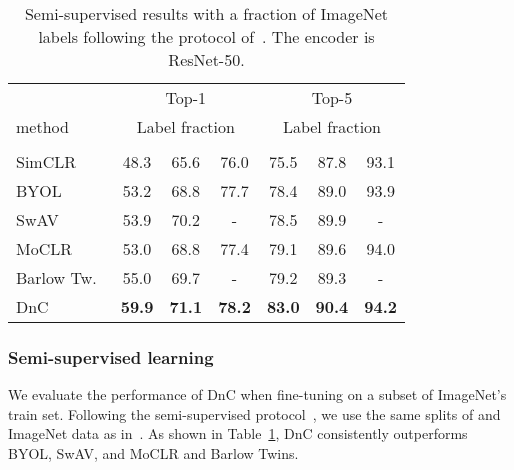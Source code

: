 \documentclass[final]{cvpr}
\newcommand\baseline{MoCLR}
\begin{document}
\begin{table}[t]
\caption{Semi-supervised results with a fraction of ImageNet labels following the protocol of~\cite{chen2020simple,grill2020bootstrap}. The encoder is ResNet-50.}
\vspace{-5pt}
\label{tab:semi_results}
\setlength{\tabcolsep}{4.5pt}
\begin{center}
\begin{small}
\begin{tabular}{lcccccc}
\toprule
 & \multicolumn{3}{c}{Top-1} & \multicolumn{3}{c}{Top-5}\\
method & \multicolumn{3}{c}{Label fraction} & \multicolumn{3}{c}{Label fraction}\\
 &  &  &  &  &  &  \\
\midrule
SimCLR~\cite{chen2020simple}     & 48.3 & 65.6 & 76.0    & 75.5 & 87.8 & 93.1 \\
BYOL~\cite{grill2020bootstrap}       & 53.2 & 68.8 & 77.7    & 78.4 & 89.0 & 93.9 \\
SwAV~\cite{caron2020unsupervised}    & 53.9 & 70.2 & -    & 78.5 & 89.9 & - \\
\baseline{}& 53.0 & 68.8 & 77.4    & 79.1 & 89.6 & 94.0 \\
Barlow Tw.~\cite{zbontar2021barlow} & 55.0 & 69.7 & - & 79.2 & 89.3 & - \\ 
DnC        & \cellcolor{DnCBG}\textbf{59.9} & \cellcolor{DnCBG}\textbf{71.1} & \cellcolor{DnCBG}\textbf{78.2} & \cellcolor{DnCBG}\textbf{83.0} & \cellcolor{DnCBG}\textbf{90.4} & \cellcolor{DnCBG}\textbf{94.2} \\
\bottomrule
\end{tabular}
\end{small}
\end{center}
\vspace{-15pt}
\end{table} \subsubsection{Semi-supervised learning}
We evaluate the performance of DnC when fine-tuning on a subset of ImageNet's train set. Following the semi-supervised protocol~\cite{kornblith2019better,zhai2019s4l,chen2020simple,grill2020bootstrap}, we use the same splits of  and  ImageNet data as in~\cite{chen2020simple,grill2020bootstrap}. As shown in Table~\ref{tab:semi_results}, DnC consistently outperforms BYOL, SwAV, and MoCLR and Barlow Twins. 
\end{document}
